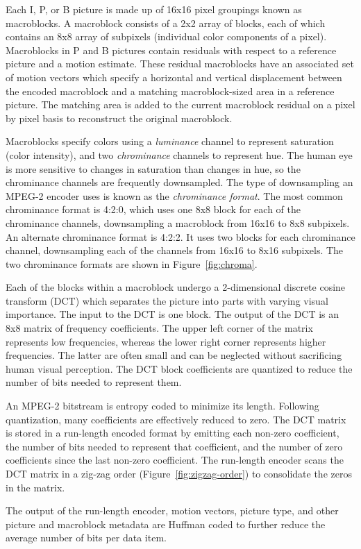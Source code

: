 Each I, P, or B picture is made up of 16x16 pixel groupings known as macroblocks. A
macroblock consists of a 2x2 array of blocks, each of which contains
an 8x8 array of subpixels (individual color components of a pixel). Macroblocks in
P and B pictures contain residuals with respect to a reference picture
and a motion estimate. These residual macroblocks have an associated 
set of motion vectors which specify a horizontal and vertical displacement 
between the encoded macroblock and a matching macroblock-sized area in a 
reference picture. The matching area is added to the current macroblock residual
on a pixel by pixel basis to reconstruct the original macroblock.

Macroblocks specify colors using a {\it
luminance} channel to represent saturation (color intensity), and two
{\it chrominance} channels to represent hue.  The human eye is more
sensitive to changes in saturation than changes in hue, so the
chrominance channels are frequently downsampled. The type of
downsampling an MPEG-2 encoder uses is known as the {\it chrominance
format}. The most common chrominance format is 4:2:0, which uses one
8x8 block for each of the chrominance channels, downsampling a
macroblock from 16x16 to 8x8 subpixels. An alternate chrominance format
is 4:2:2. It uses two blocks for each chrominance channel,
downsampling each of the channels from 16x16 to 8x16 subpixels. The two
chrominance formats are shown in Figure~\ref{fig:chroma}.

Each of the blocks within a macroblock undergo a 2-dimensional
discrete cosine transform (DCT) which separates the picture into parts
with varying visual importance. The input to the DCT is one block.
The output of the DCT is an 8x8 matrix of frequency coefficients. 
The upper left corner of the matrix represents low frequencies, whereas 
the lower right corner represents higher frequencies. The latter are 
often small and can be neglected without sacrificing human visual perception.
The DCT block coefficients are quantized to reduce the number of bits needed
to represent them. 

An MPEG-2 bitstream is entropy coded to minimize its length. 
Following quantization, many coefficients are effectively reduced to zero. 
The DCT matrix is stored in a run-length encoded format by emitting each 
non-zero coefficient, the number of bits needed to represent that coefficient, 
and the number of zero coefficients since the last non-zero coefficient. The
run-length encoder scans the DCT matrix in a zig-zag order
(Figure~\ref{fig:zigzag-order}) to consolidate the zeros in the matrix.

The output of the run-length encoder, motion vectors, picture type,
and other picture and macroblock metadata are Huffman coded to
further reduce the average number of bits per data item.
